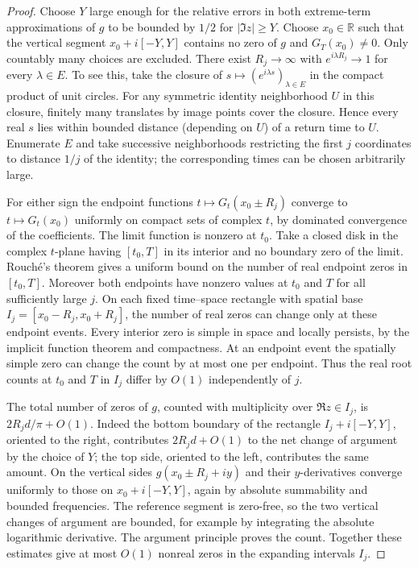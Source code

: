 \documentclass[11pt]{article}
\begin{document}
\begin{proof}
Choose $Y$ large enough for the relative errors in both extreme-term
approximations of $g$ to be bounded by $1/2$ for $|\Im z|\ge Y$.
Choose $x_0\in\mathbb R$ such that the vertical segment
$x_0+i[-Y,Y]$ contains no zero of $g$ and $G_T(x_0)\ne0$.
Only countably many choices are excluded. There exist $R_j\to\infty$
with $e^{i\lambda R_j}\to1$ for every $\lambda\in E$. To see this,
take the closure of $s\mapsto(e^{i\lambda s})_{\lambda\in E}$ in
the compact product of unit circles. For any symmetric identity
neighborhood $U$ in this closure, finitely many translates by image
points cover the closure. Hence every real $s$ lies within bounded
distance (depending on $U$) of a return time to $U$. Enumerate
$E$ and take successive neighborhoods restricting the first $j$
coordinates to distance $1/j$ of the identity; the corresponding
times can be chosen arbitrarily large.

For either sign the endpoint functions $t\mapsto G_t(x_0\pm R_j)$
converge to $t\mapsto G_t(x_0)$ uniformly on compact sets of complex
$t$, by dominated convergence of the coefficients. The limit function
is nonzero at $t_0$. Take a closed disk in the complex $t$-plane
having $[t_0,T]$ in its interior and no boundary zero of the limit.
Rouch\'e's theorem gives a uniform bound on the number of real
endpoint zeros in $[t_0,T]$. Moreover both endpoints have nonzero
values at $t_0$ and $T$ for all sufficiently large $j$.
On each fixed time--space rectangle with spatial base
$I_j=[x_0-R_j,x_0+R_j]$, the number of real zeros can change only at
these endpoint events. Every interior zero is simple in space and
locally persists, by the implicit function theorem and compactness.
At an endpoint event the spatially simple zero can change the count
by at most one per endpoint. Thus the real root counts at $t_0$ and
$T$ in $I_j$ differ by $O(1)$ independently of $j$.

The total number of zeros of $g$, counted with multiplicity over
$\Re z\in I_j$, is $2R_jd/\pi+O(1)$. Indeed the bottom boundary of
the rectangle $I_j+i[-Y,Y]$, oriented to the right, contributes
$2R_jd+O(1)$ to the net change of argument by the choice of $Y$;
the top side, oriented to the left, contributes the same amount.
On the vertical sides $g(x_0\pm R_j+iy)$ and their $y$-derivatives
converge uniformly to those on $x_0+i[-Y,Y]$, again by absolute
summability and bounded frequencies. The reference segment is
zero-free, so the two vertical changes of argument are bounded,
for example by integrating the absolute logarithmic derivative.
The argument principle proves the count. Together these estimates
give at most $O(1)$ nonreal zeros in the expanding intervals $I_j$.


\end{proof}
\end{document}
